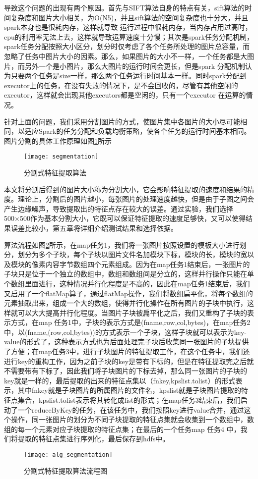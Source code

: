 导致这个问题的出现有两个原因。首先与SIFT算法自身的特点有关，sift算法的时间复杂度和图片大小相关，为O(N5)，并且sift算法的空间复杂度也十分大，并且spark本身也是很耗内存，这样就导致 运行过程中很耗内存，当内存占用过高时，cpu的利用率无法上去，这样就导致运算速度十分慢；其次是spark任务分配机制，spark任务分配按照大小区分，划分时仅考虑了各个任务所处理的图片总容量，而忽略了任务中图片大小的因素。那么，如果图片的大小不一样，一个任务都是大图片，而另外一个是小图片，那么大图片的运行时间会更长，但是spark 分配机制认为只要两个任务是size一样，那么两个任务运行时间基本一样。同时spark分配到executor上的任务，在没有失败的情况下，是不会回收的，尽管有其他空闲的executor，这样就会出现其他executors都是空闲的，只有一个executor 在运算的情况。

针对上面的问题，我们采用分割图片的方式，使图片集中各图片的大小尽可能相同，以适应Spark的任务分配和负载均衡策略，使各个任务的运行时间基本相同。图片分割的具体工作原理如图\ref{fig:segmentation}所示
\begin{figure}[htp]
\centering
\texttt{[image: segmentation]}
\caption{分割式特征提取算法}
\label{fig:segmentation}
\end{figure}

本文将分割后得到的图片大小称为分割大小，它会影响特征提取的速度和结果的精度。理论上，分割后的图片越小，每张图片的处理速度越快，但是由于子图之间会产生边缘噪声，导致提取出的特征点存在较大的误差。通过实验，我们选择500×500作为基本分割大小，它既可以保证特征提取的速度足够快，又可以使得结果误差比较小，第五章将详细介绍测试结果和选择依据。

算法流程如图\ref{fig:alg_segmentation}所示，在map任务1，我们将一张图片按照设置的模板大小进行划分，划分为多个子块，每个子块以图片文件名加模块下标，模块的长，模块的宽以及模块的像素内容字节数组四个元素组成。因为在map任务1结束后，一张图片的子块只是位于一个独立的数组中，数组和数组间是分立的，这样并行操作只能在单个数组里面进行，这种情况并行化程度是不高的，因此在map任务1结束后，我们又启用了一个flatMap算子，通过flatMap操作，我们将数组扁平化，将每个数组的元素抽取出来，组成一个大的数组，使得并行化操作在所有图片的子块中执行，这样就可以大大提高并行化程度。当图片子块被扁平化之后，我们又重构了子块的表示方式，在map 任务1中，子块的表示方式是(fname,row,col,bytes)，在map任务2 中，以(fname,(row,col,bytes))的方式表示一个子块，这样子块就可以表示为key-value的形式了，这种表示方式也为后面处理完子块后收集同一张图片的子块提供了方便；在map任务3中，进行子块图片的特征提取工作，在这个任务中，我们还进行key的重构工作，因为之前子块的key是带有下标的，但是在特征提取完之后就不需要带有下标了，因此我们将子块图片的下标去掉，那么同一张图片的子块的key就是一样的，最后提取的出来的特征点集以（fnkey,kpslist.tolist）的形式表示，其中fnkey就是子块图片的所属图片的文件名，kpslist就是子块图片提取的特征点集合，kpslist.tolist表示将其转化成list的形式；在map任务3结束后，我们启动了一个reduceByKey的任务，在该任务中，我们按照key进行value合并，通过这个操作，同一张图片的划分为不同子块提取的特征点集就会收集到一个数组中，数组的每一个元素对应子块提取的特征点集；在最后的一个任务map 任务4 中，我们将提取的特征点集进行序列化，最后保存到hdfs中。
\begin{figure}[htp]
\centering
\texttt{[image: alg\_segmentation]}
\caption{分割式特征提取算法流程图}
\label{fig:alg_segmentation}
\end{figure}

